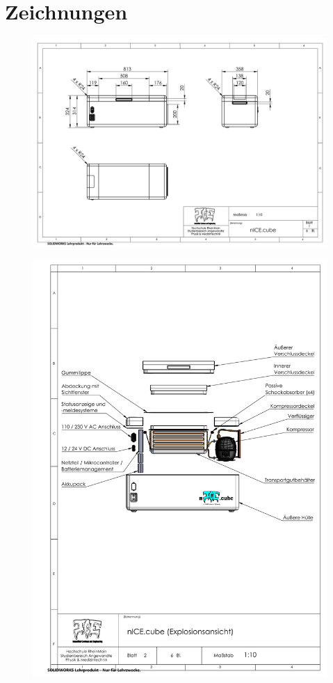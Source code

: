 \chapter{Zeichnungen}
	\begin{figure}[h]
		\centering
		\includegraphics[angle=90, height=\textheight]{Assembly/aussen_zeichnung.PDF}
		\label{fig:zeichnung aussen}
	\end{figure}
	\clearpage
	\begin{figure}[h]
		\centering
		\includegraphics[height=\textheight]{Assembly/explo_zeichnung.PDF}
		\label{fig:explo}
	\end{figure}
